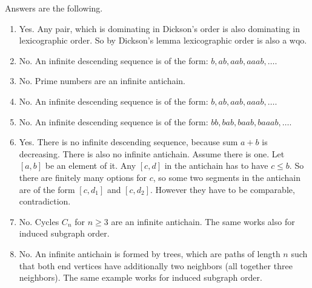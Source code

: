 {
Answers are the following.
\begin{enumerate}
  \item Yes. Any pair, which is dominating in Dickson's order is also dominating in lexicographic
  order. So by Dickson's lemma lexicographic order is also a wqo.
  \item No. An infinite descending sequence is of the form: $b, ab, aab, aaab, \ldots$.
  \item No. Prime numbers are an infinite antichain.
  \item No. An infinite descending sequence is of the form: $b, ab, aab, aaab, \ldots$.
  \item No. An infinite descending sequence is of the form: $bb, bab, baab, baaab, \ldots$.
  \item Yes. There is no infinite descending sequence, because sum $a+b$ is decreasing.
  There is also no infinite antichain. Assume there is one. Let $[a,b]$ be an element of it.
  Any $[c,d]$ in the antichain has to have $c \leq b$. So there are finitely many options for $c$,
  so some two segments in the antichain are of the form $[c,d_1]$ and $[c,d_2]$. However
  they have to be comparable, contradiction.
  \item No. Cycles $C_n$ for $n \geq 3$ are an infinite antichain. The same works also for induced subgraph order.
  \item No. An infinite antichain is formed by trees, which are paths of length $n$ such that both end vertices have
  additionally two neighbors (all together three neighbors). The same example works for induced subgraph
  order.
\end{enumerate}
}




